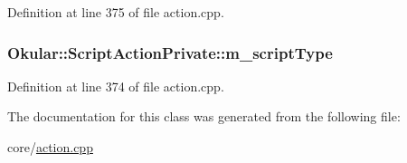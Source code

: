 Definition at line 375 of file action.\+cpp.

\hypertarget{classOkular_1_1ScriptActionPrivate_a9075c555fafb3fb79499bc2b32002518}{
\subsubsection[{m\+\_\+script\+Type}]{ Okular\+::\+Script\+Action\+Private\+::m\+\_\+script\+Type}}\label{classOkular_1_1ScriptActionPrivate_a9075c555fafb3fb79499bc2b32002518}


Definition at line 374 of file action.\+cpp.



The documentation for this class was generated from the following file\+:\begin{DoxyCompactItemize}
\item 
core/\hyperlink{action_8cpp}{action.\+cpp}\end{DoxyCompactItemize}
